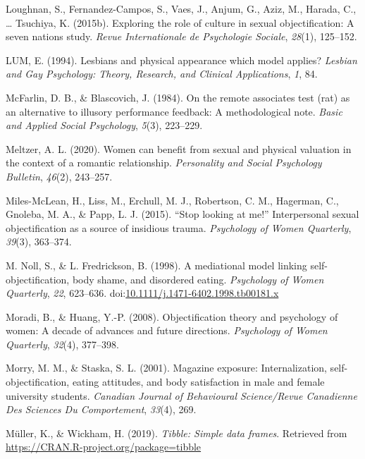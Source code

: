 \documentclass[
  man]{apa6}
\begin{document}
\leavevmode\hypertarget{ref-loughnan2015}{}%
Loughnan, S., Fernandez-Campos, S., Vaes, J., Anjum, G., Aziz, M., Harada, C., \ldots{} Tsuchiya, K. (2015b). Exploring the role of culture in sexual objectification: A seven nations study. \emph{Revue Internationale de Psychologie Sociale}, \emph{28}(1), 125--152.

\leavevmode\hypertarget{ref-lum1994lesbians}{}%
LUM, E. (1994). Lesbians and physical appearance which model applies? \emph{Lesbian and Gay Psychology: Theory, Research, and Clinical Applications}, \emph{1}, 84.

\leavevmode\hypertarget{ref-mcfarlin1984remote}{}%
McFarlin, D. B., \& Blascovich, J. (1984). On the remote associates test (rat) as an alternative to illusory performance feedback: A methodological note. \emph{Basic and Applied Social Psychology}, \emph{5}(3), 223--229.

\leavevmode\hypertarget{ref-meltzer2020women}{}%
Meltzer, A. L. (2020). Women can benefit from sexual and physical valuation in the context of a romantic relationship. \emph{Personality and Social Psychology Bulletin}, \emph{46}(2), 243--257.

\leavevmode\hypertarget{ref-miles2015stop}{}%
Miles-McLean, H., Liss, M., Erchull, M. J., Robertson, C. M., Hagerman, C., Gnoleba, M. A., \& Papp, L. J. (2015). ``Stop looking at me!'' Interpersonal sexual objectification as a source of insidious trauma. \emph{Psychology of Women Quarterly}, \emph{39}(3), 363--374.

\leavevmode\hypertarget{ref-nollfredrickson1998}{}%
M. Noll, S., \& L. Fredrickson, B. (1998). A mediational model linking self-objectification, body shame, and disordered eating. \emph{Psychology of Women Quarterly}, \emph{22}, 623--636. doi:\href{https://doi.org/10.1111/j.1471-6402.1998.tb00181.x}{10.1111/j.1471-6402.1998.tb00181.x}

\leavevmode\hypertarget{ref-moradi2008}{}%
Moradi, B., \& Huang, Y.-P. (2008). Objectification theory and psychology of women: A decade of advances and future directions. \emph{Psychology of Women Quarterly}, \emph{32}(4), 377--398.

\leavevmode\hypertarget{ref-morry2001magazine}{}%
Morry, M. M., \& Staska, S. L. (2001). Magazine exposure: Internalization, self-objectification, eating attitudes, and body satisfaction in male and female university students. \emph{Canadian Journal of Behavioural Science/Revue Canadienne Des Sciences Du Comportement}, \emph{33}(4), 269.

\leavevmode\hypertarget{ref-R-tibble}{}%
Müller, K., \& Wickham, H. (2019). \emph{Tibble: Simple data frames}. Retrieved from \url{https://CRAN.R-project.org/package=tibble}
\end{document}
